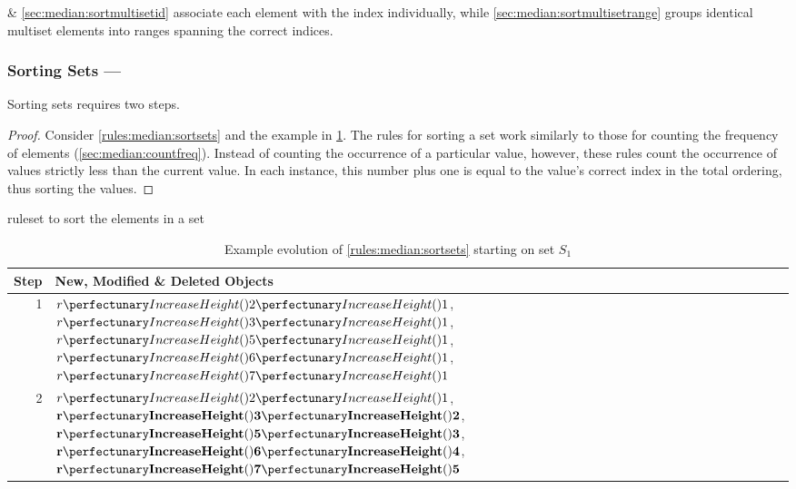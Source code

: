  \& \cref{sec:median:sortmultisetid} associate each element with the index individually, while \cref{sec:median:sortmultisetrange} groups identical multiset elements into ranges spanning the correct indices.

\subsubsection{Sorting Sets --- }  \label{sec:median:sortsets}

\begin{proposition}\label{prop:median:sortsets}
Sorting sets requires two steps.
\end{proposition}

\begin{proof}
Consider \cref{rules:median:sortsets} and the example in \cref{tab:median:sortsets}.  The rules for sorting a set work similarly to those for counting the frequency of elements (\cref{sec:median:countfreq}).  Instead of counting the occurrence of a particular value, however, these rules count the occurrence of values strictly less than the current value.  In each instance, this number plus one is equal to the value's correct index in the total ordering, thus sorting the values.
\end{proof}

\begin{cprulesetfloat}
\begin{cpruleset}

\end{cpruleset}
\caption{\label{rules:median:sortsets}\Gls{ruleset} to sort the elements in a set}
\end{cprulesetfloat}

\begin{table}[htbp]
\centering
   \begin{tabular}{|r|l|}
    \hline
    \textbf{Step} & \textbf{New, Modified \& Deleted Objects} \\ \hline
    1 & \(\cpfuncn{r}{2}{1}\), \(\cpfuncn{r}{3}{1}\), \(\cpfuncn{r}{5}{1}\), \(\cpfuncn{r}{6}{1}\), \(\cpfuncn{r}{7}{1}\)\\ \hline
    2 & \(\cpfuncn{r}{2}{1}\), \(\mathbf{\cpfuncn{r}{3}{2}}\), \(\mathbf{\cpfuncn{r}{5}{3}}\), \(\mathbf{\cpfuncn{r}{6}{4}}\), \(\mathbf{\cpfuncn{r}{7}{5}}\)\\ \hline

\end{tabular}
\caption[Example evolution of \cref{rules:median:sortsets} to sort the elements in a set]{\label{tab:median:sortsets}Example evolution of \cref{rules:median:sortsets} starting on set \(S_1\)}
\end{table}

